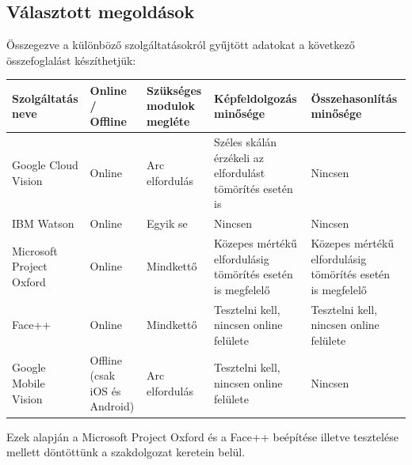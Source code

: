 \subsection{Választott megoldások}
Összegezve a különböző szolgáltatásokról gyűjtött adatokat a következő összefoglalást készíthetjük:
\begin{center}
	\begin{tabular}{|p{3cm}|p{2cm} |p{2cm} | p{3cm}|p{3cm}|}
   	\hline
	\textbf{Szolgáltatás neve} & \textbf{Online / Offline} & \textbf{Szükséges modulok megléte} & \textbf{Képfeldolgozás minősége} &\textbf{ Összehasonlítás minősége} \\ \hline
	Google Cloud Vision & Online & Arc elfordulás & Széles skálán érzékeli az elfordulást tömörítés esetén is & Nincsen \\ \hline
	IBM Watson & Online & Egyik se & Nincsen & Nincsen \\ \hline
	Microsoft Project Oxford & Online & Mindkettő & Közepes mértékű elfordulásig tömörítés esetén is megfelelő & Közepes mértékű elfordulásig tömörítés esetén is megfelelő\\ \hline
	Face++ & Online & Mindkettő & Tesztelni kell, nincsen online felülete & Tesztelni kell, nincsen online felülete \\ \hline
	Google Mobile Vision & Offline (csak iOS és Android) & Arc elfordulás & Tesztelni kell, nincsen online felülete & Nincsen \\ \hline
	\end{tabular}
\end{center}

Ezek alapján a Microsoft Project Oxford és a Face++ beépítése illetve tesztelése mellett döntöttünk a szakdolgozat keretein belül.

\newpage